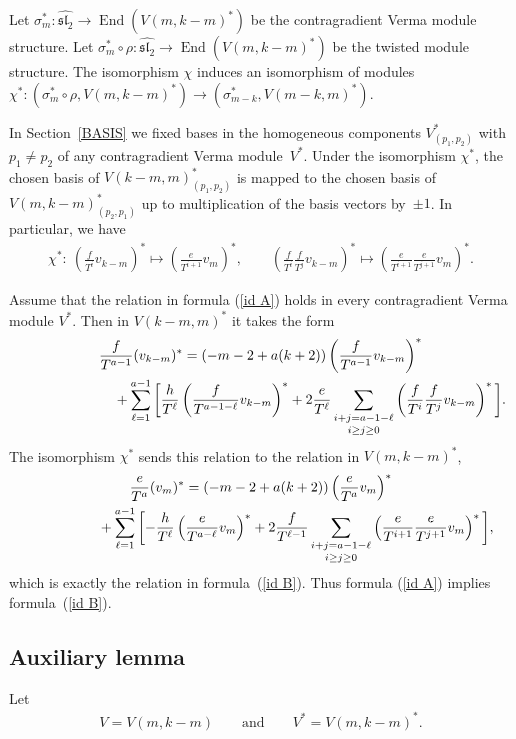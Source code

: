 \documentclass[pdftex]{sigma}
\numberwithin{equation}{section}
\begin{document}
Let $ \sigma^*_m \colon \widehat{{\mathfrak{sl}_2}} \to \operatorname{End}( V(m,k-m)^*)$ be the contragradient Verma module structure. Let $ \sigma^*_m\circ \rho \colon \widehat{{\mathfrak{sl}_2}} \to \operatorname{End}( V(m,k-m)^*)$ be the twisted module structure. The isomorphism $\chi$ induces an isomorphism of modules $\chi^* \colon (\sigma^*_m\circ \rho, V(m,k-m)^*) \to (\sigma^*_{m-k}, V(m-k,m)^*)$.

In Section~\ref{BASIS} we fixed bases in the homogeneous components $V^*_{(p_1,p_2)}$ with $p_1\ne p_2$ of any contragradient Verma module~$V^*$. Under the isomorphism $\chi^*$, the chosen basis of $V(k-m, m)^*_{(p_1,p_2)}$ is mapped to the chosen basis of $V(m,k-m)^*_{(p_2,p_1)}$ up to multiplication of the basis vectors by~$\pm 1$. In particular, we have
\begin{gather*}
 \chi^* \colon \ \left(\frac f{T^i}v_{k-m}\right)^* \mapsto \left(\frac e{T^{i+1}}v_{m}\right)^*, \qquad
\left(\frac f{T^i} \frac f{T^j} v_{k-m}\right)^* \mapsto \left(\frac e{T^{i+1}}\frac e{T^{j+1}}v_{m}\right)^*.
\end{gather*}

Assume that the relation in formula (\ref{id A}) holds in every contragradient Verma module $V^*$. Then in $V(k-m, m)^*$ it takes the form
\begin{gather*}
\frac{f}{T^{a-1}} (v_{k-m})^* = (-m-2+ a(k+2))\left(\frac{f}{T^{a-1}}v_{k-m}\right)^* \nonumber \\
\hphantom{\frac{f}{T^{a-1}} (v_{k-m})^* =}{} + \sum_{\ell=1}^{a-1} \bigg[\frac{h}{T^\ell}\left(\frac{f}{T^{a-1-\ell}}v_{k-m}\right)^* + 2 \frac{e}{T^\ell}\mathop{\sum_{i+j=a-1-\ell}}_{i\geq j\geq 0}
\left(\frac{f}{T^i}\frac{f}{T^j}v_{k-m}\right)^*\bigg].%
\end{gather*}
The isomorphism $\chi^*$ sends this relation to the relation in $V(m,k-m)^*$,
\begin{gather*}
\frac{e}{T^{a}} (v_{m})^* = (-m-2+ a(k+2))\left(\frac{e}{T^{a}}v_{m}\right)^* \nonumber\\
\hphantom{\frac{e}{T^{a}} (v_{m})^* =}{} + \sum_{\ell=1}^{a-1} \bigg[{-}\frac{h}{T^\ell}\left(\frac{e}{T^{a-\ell}}v_{m}\right)^* + 2 \frac{f}{T^{\ell-1}}\mathop{\sum_{i+j=a-1-\ell}}_{i\geq j\geq 0}
\left(\frac{e}{T^{i+1}}\frac{e}{T^{j+1}}v_{m}\right)^*\bigg],%
\end{gather*}
which is exactly the relation in formula~(\ref{id B}). Thus formula (\ref{id A}) implies formula~(\ref{id B}).

\subsection{Auxiliary lemma}\label{subsec aux lemma}
Let
\begin{gather*}
V=V(m,k-m) \qquad \text{and} \qquad V^* = V(m,k-m)^*.
\end{gather*}
\end{document}
